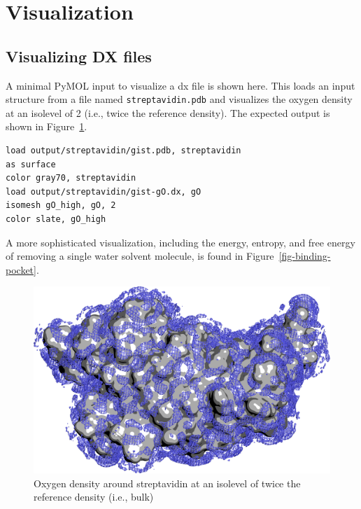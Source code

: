 \documentclass[9pt,tutorial]{livecoms}
\newcommand\inlinecode{\texttt}
\begin{document}
\section{Visualization}
\label{sec:visualization}
\subsection{Visualizing DX files}
A minimal PyMOL input to visualize a dx file is shown here.
This loads an input structure from a file named \inlinecode{streptavidin.pdb} and visualizes the oxygen density at an isolevel of 2 (i.e., twice the reference density).
The expected output is shown in Figure~\ref{fig-streptavidin_gO}.

\begin{lstlisting}[style=pymol]
load output/streptavidin/gist.pdb, streptavidin
as surface
color gray70, streptavidin
load output/streptavidin/gist-gO.dx, gO
isomesh gO_high, gO, 2
color slate, gO_high
\end{lstlisting}
A more sophisticated visualization, including the energy, entropy, and free energy of removing a single water solvent 
molecule, is found in Figure~\ref{fig-binding-pocket}.
\begin{figure}
	\centering
	\includegraphics[width=1\linewidth]{figures/streptavidin_gO_high_surf.png}
	\caption{Oxygen density around streptavidin at an isolevel of twice the reference density (i.e., bulk)}
	\label{fig-streptavidin_gO}
\end{figure}
\end{document}
